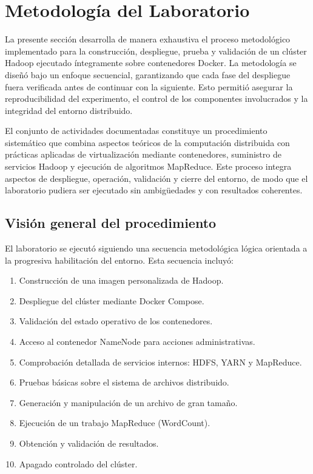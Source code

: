 \section{Metodología del Laboratorio}

La presente sección desarrolla de manera exhaustiva el proceso metodológico implementado para la construcción, despliegue, prueba y validación de un clúster Hadoop ejecutado íntegramente sobre contenedores Docker. La metodología se diseñó bajo un enfoque secuencial, garantizando que cada fase del despliegue fuera verificada antes de continuar con la siguiente. Esto permitió asegurar la reproducibilidad del experimento, el control de los componentes involucrados y la integridad del entorno distribuido.

El conjunto de actividades documentadas constituye un procedimiento sistemático que combina aspectos teóricos de la computación distribuida con prácticas aplicadas de virtualización mediante contenedores, suministro de servicios Hadoop y ejecución de algoritmos MapReduce. Este proceso integra aspectos de despliegue, operación, validación y cierre del entorno, de modo que el laboratorio pudiera ser ejecutado sin ambigüedades y con resultados coherentes.

\subsection{Visión general del procedimiento}

El laboratorio se ejecutó siguiendo una secuencia metodológica lógica orientada a la progresiva habilitación del entorno. Esta secuencia incluyó:

\begin{enumerate}
    \item Construcción de una imagen personalizada de Hadoop.
    \item Despliegue del clúster mediante Docker Compose.
    \item Validación del estado operativo de los contenedores.
    \item Acceso al contenedor NameNode para acciones administrativas.
    \item Comprobación detallada de servicios internos: HDFS, YARN y MapReduce.
    \item Pruebas básicas sobre el sistema de archivos distribuido.
    \item Generación y manipulación de un archivo de gran tamaño.
    \item Ejecución de un trabajo MapReduce (WordCount).
    \item Obtención y validación de resultados.
    \item Apagado controlado del clúster.
\end{enumerate}

